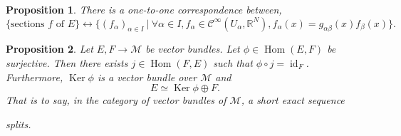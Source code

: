 \documentclass[10pt]{article}
\newtheorem{proposition}{Proposition}[section]
\DeclareMathOperator{\Hom}{Hom}
\DeclareMathOperator{\Ker}{Ker}
\DeclareMathOperator{\id}{id}
\newcommand{\R}[0]{\mathbb{R}}
\newcommand{\M}[0]{\mathcal{M}}
\newcommand{\sep}[0]{\:|\:}
\begin{document}
\begin{proposition}
  \label{proposition_9_8}
  There is a one-to-one correspondence between,
  \begin{equation*}
    \{\text{sections $f$ of $E$}\}\leftrightarrow\{(f_\alpha)_{\alpha\in I}\sep \forall \alpha\in I, f_\alpha\in\mathcal{C}^\infty (U_\alpha,\R^N), f_\alpha(x)=g_{\alpha\beta}(x)f_\beta(x)\}.
  \end{equation*}
\end{proposition}
\begin{proposition}
  \label{proposition_9_9}
  Let $E,F\to\M$ be vector bundles. Let $\phi\in\Hom(E,F)$ be surjective. Then there exists $j\in\Hom(F,E)$ such that $\phi\circ j = \id_F$. Furthermore, $\Ker\phi$ is a vector bundle over $\M$ and 
  \begin{equation*}
    E\simeq \Ker\phi\oplus F.
  \end{equation*}
  That is to say, in the category of vector bundles of $\M$, a short exact sequence 
  \begin{center}
  \end{center}
  splits.
\end{proposition}
\end{document}
